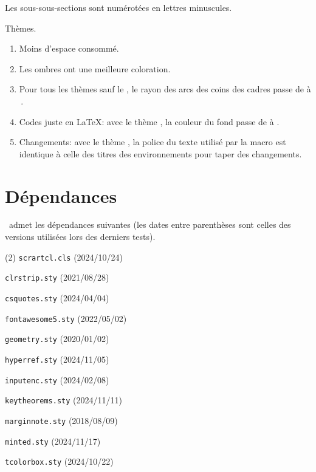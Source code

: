 {\begin{tdocupdate}
	\item Les sous-sous-sections sont numérotées en lettres minuscules.

	\item Thèmes.
	\begin{enumerate}
		\item Moins d'espace consommé.

		\item Les ombres ont une meilleure coloration.

		\item Pour tous les thèmes sauf le , le rayon des arcs des coins des cadres passe de \tdoclatexin{.75mm} à \tdoclatexin{.2pt}\,.

 		\item Codes juste en \LaTeX: avec le thème , la couleur du fond passe de  à .

		\item Changements: avec le thème , la police du texte \tdoclatexin{[Init]} utilisé par la macro  est identique à celle des titres des environnements pour taper des changements.
	\end{enumerate}
\end{tdocupdate}
}


\newpage
\tableofcontents
\newpage


\section{Dépendances}

\thisproj\ admet les dépendances suivantes (les dates entre parenthèses sont celles des versions utilisées lors des derniers tests).
%
\begin{tasks}[style=itemize](2)
    \task \texttt{scrartcl.cls}
    \hfill {\small (2024/10/24)}\kern10pt

    \task \texttt{clrstrip.sty}
    \hfill {\small (2021/08/28)}\kern10pt

    \task \texttt{csquotes.sty}
    \hfill {\small (2024/04/04)}\kern10pt

    \task \texttt{fontawesome5.sty}
    \hfill {\small (2022/05/02)}\kern10pt

    \task \texttt{geometry.sty}
    \hfill {\small (2020/01/02)}\kern10pt

    \task \texttt{hyperref.sty}
    \hfill {\small (2024/11/05)}\kern10pt

    \task \texttt{inputenc.sty}
    \hfill {\small (2024/02/08)}\kern10pt

    \task \texttt{keytheorems.sty}
    \hfill {\small (2024/11/11)}\kern10pt

    \task \texttt{marginnote.sty}
    \hfill {\small (2018/08/09)}\kern10pt

    \task \texttt{minted.sty}
    \hfill {\small (2024/11/17)}\kern10pt

    \task \texttt{tcolorbox.sty}
    \hfill {\small (2024/10/22)}\kern10pt
\end{tasks}


